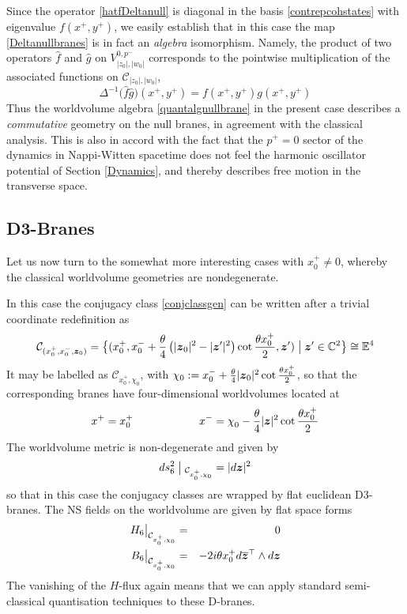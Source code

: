 Since the operator \eqref{hatfDeltanull} is diagonal in the basis
\eqref{contrepcohstates} with eigenvalue $f(x^+,y^+)$, we easily establish that
in this case the map \eqref{Deltanullbranes} is in fact an {\it algebra}
isomorphism. Namely, the product of two operators $\hat f$ and $\hat g$ on
$V_{|z_0|,|w_0|}^{0,p^-}$ corresponds to the pointwise multiplication of the
associated functions on $\mathcal{C}_{|z_0|,|w_0|}$,
\begin{equation}
  \label{commprodnull}
  \Delta^{-1}\bigl(\hat f \hat g \bigr)\left(x^+,y^+\right)=
  f\left(x^+,y^+\right) g\left(x^+,y^+\right)
\end{equation}
Thus the worldvolume algebra \eqref{quantalgnullbrane} in the present case
describes a {\it commutative} geometry on the null branes, in agreement with the
classical analysis. This is also in accord with the fact that the $p^+=0$ sector
of the dynamics in Nappi-Witten spacetime does not feel the harmonic oscillator
potential of Section \ref{Dynamics}, and thereby describes free motion in the
transverse space.

\subsection{D3-Branes}
\label{CGED3B}

Let us now turn to the somewhat more interesting cases with $x_0^+\neq0$,
whereby the classical worldvolume geometries are nondegenerate.

In this case the conjugacy class \eqref{conjclassgen} can be written after a
trivial coordinate redefinition as
\begin{equation}
  \label{conjpieucl4}
  \mathcal{C}_{(x_0^+,x_0^-,{{\boldsymbol {z} }}_0)}=
  \bigl\{(x_0^+ , x_0^-+\frac\theta4 \left(|{{\boldsymbol {z} }}_0|^2-|{{\boldsymbol {z} }}' |^2
  \right) \cot\frac{\theta x_0^+}2 , {{\boldsymbol {z} }}' )\bigm|{{\boldsymbol {z} }}'
  \in{\mathbb C}^2\bigr\}\cong{\mathbb E}^4
\end{equation}
It may be labelled as $\mathcal{C}_{x_0^+,\chi^{ }_0}$, with
$\chi_0:=x_0^-+\frac\theta4 |{{\boldsymbol {z} }}_0|^2 \cot\frac{\theta x_0^+}2$, so that the
corresponding branes have four-dimensional worldvolumes located at
\begin{equation}
  \label{E4branesloc}
  x^+=x_0^+ \qquad\qquad\qquad x^-=\chi^{ }_0-\frac{\theta}4 |{{\boldsymbol {z} }}|^2 \cot\frac{\theta
    x_0^+}2
\end{equation}
The worldvolume metric is non-degenerate and given by
\begin{equation}
  \label{metricpieucl4}
  d s_6^2\bigm|{}_{\mathcal{C}_{x_0^+,\chi_0}}=| d{{\boldsymbol {z} }}|^2
\end{equation}
so that in this case the conjugacy classes are wrapped by flat euclidean
D3-branes. The NS fields on the worldvolume are given by flat space forms
\begin{eqnarray}
  \label{NSconj}
  H_6\bigl|_{\mathcal{C}_{x_0^+,\chi_0}}&=&0 \\
  \label{NSconjB6}
  B_6\bigl|_{\mathcal{C}_{x_0^+,\chi_0}}&=&-2 i\theta 
  x_0^+ d\overline{{{\boldsymbol {z} }}}^{ \top}\wedge d{{\boldsymbol {z} }}
\end{eqnarray}
The vanishing of the $H$-flux again means that we can apply standard
semi-classical quantisation techniques to these D-branes.

